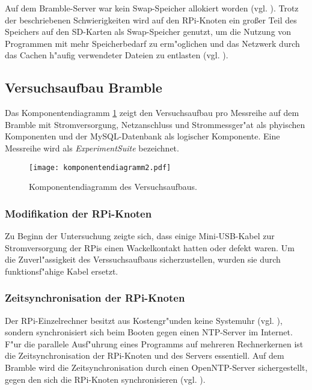 Auf dem Bramble-Server war kein Swap-Speicher allokiert worden (vgl. \cite{kli13}). Trotz der beschriebenen Schwierigkeiten wird auf den RPi-Knoten ein gro\ss er Teil des Speichers auf den SD-Karten als Swap-Speicher genutzt, um die Nutzung von Programmen mit mehr Speicherbedarf zu erm"oglichen und das Netzwerk durch das Cachen h"aufig verwendeter Dateien zu entlasten (vgl. \cite{kli13}).  

\subsection{Versuchsaufbau Bramble}\label{Bramble-Versuchsaufbau}

Das Komponentendiagramm \ref{fig:Komponentendiagramm} zeigt den Versuchsaufbau pro Messreihe auf dem Bramble mit Stromversorgung, Netzanschluss und Strommessger"at als phyischen Komponenten und der MySQL-Datenbank als logischer Komponente. Eine Messreihe wird als \textit{ExperimentSuite} bezeichnet. 
\begin{figure}[htb]
  \centering
  \centerline{\texttt{[image: komponentendiagramm2.pdf]}} 
  \caption{Komponentendiagramm des Versuchsaufbaus.}
  \label{fig:Komponentendiagramm}		
\end{figure}
\subsubsection{Modifikation der RPi-Knoten}

Zu Beginn der Untersuchung zeigte sich, dass einige Mini-USB-Kabel zur Stromversorgung der RPis einen Wackelkontakt hatten oder defekt waren. Um die Zuverl"assigkeit des Verssuchsaufbaus sicherzustellen, wurden sie durch funktionsf"ahige Kabel ersetzt. 

\subsubsection{Zeitsynchronisation der RPi-Knoten} 

Der RPi-Einzelrechner besitzt aus Kostengr"unden keine Systemuhr (vgl. \cite{schmi13}), sondern synchronisiert sich beim Booten gegen einen NTP-Server im Internet. F"ur die parallele Ausf"uhrung eines Programms auf mehreren Rechnerkernen ist die Zeitsynchronisation der RPi-Knoten und des Servers essentiell. Auf dem Bramble wird die Zeitsynchronisation durch einen OpenNTP-Server sichergestellt, gegen den sich die RPi-Knoten synchronisieren (vgl. \cite{kli13}). 

